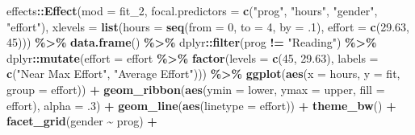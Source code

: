 \documentclass[
]{article}
\newenvironment{Shaded}{\begin{snugshade}}{\end{snugshade}}
\newcommand{\AttributeTok}[1]{\textcolor[rgb]{0.13,0.29,0.53}{#1}}
\newcommand{\DecValTok}[1]{\textcolor[rgb]{0.00,0.00,0.81}{#1}}
\newcommand{\FloatTok}[1]{\textcolor[rgb]{0.00,0.00,0.81}{#1}}
\newcommand{\FunctionTok}[1]{\textcolor[rgb]{0.13,0.29,0.53}{\textbf{#1}}}
\newcommand{\NormalTok}[1]{#1}
\newcommand{\SpecialCharTok}[1]{\textcolor[rgb]{0.81,0.36,0.00}{\textbf{#1}}}
\newcommand{\StringTok}[1]{\textcolor[rgb]{0.31,0.60,0.02}{#1}}
\begin{document}
\begin{Shaded}
\begin{Highlighting}[]
\NormalTok{effects}\SpecialCharTok{::}\FunctionTok{Effect}\NormalTok{(}\AttributeTok{mod =}\NormalTok{ fit\_2,}
                \AttributeTok{focal.predictors =} \FunctionTok{c}\NormalTok{(}\StringTok{"prog"}\NormalTok{, }\StringTok{"hours"}\NormalTok{, }
                                     \StringTok{"gender"}\NormalTok{, }\StringTok{"effort"}\NormalTok{),}
                \AttributeTok{xlevels =} \FunctionTok{list}\NormalTok{(}\AttributeTok{hours =} \FunctionTok{seq}\NormalTok{(}\AttributeTok{from =} \DecValTok{0}\NormalTok{,}
                                           \AttributeTok{to =} \DecValTok{4}\NormalTok{,}
                                           \AttributeTok{by =}\NormalTok{ .}\DecValTok{1}\NormalTok{),}
                               \AttributeTok{effort =} \FunctionTok{c}\NormalTok{(}\FloatTok{29.63}\NormalTok{, }\DecValTok{45}\NormalTok{))) }\SpecialCharTok{\%\textgreater{}\%} 
  \FunctionTok{data.frame}\NormalTok{() }\SpecialCharTok{\%\textgreater{}\%} 
\NormalTok{  dplyr}\SpecialCharTok{::}\FunctionTok{filter}\NormalTok{(prog }\SpecialCharTok{!=} \StringTok{"Reading"}\NormalTok{) }\SpecialCharTok{\%\textgreater{}\%} 
\NormalTok{  dplyr}\SpecialCharTok{::}\FunctionTok{mutate}\NormalTok{(}\AttributeTok{effort =}\NormalTok{ effort }\SpecialCharTok{\%\textgreater{}\%} 
                  \FunctionTok{factor}\NormalTok{(}\AttributeTok{levels =} \FunctionTok{c}\NormalTok{(}\DecValTok{45}\NormalTok{, }\FloatTok{29.63}\NormalTok{),}
                         \AttributeTok{labels =} \FunctionTok{c}\NormalTok{(}\StringTok{"Near Max Effort"}\NormalTok{,}
                                    \StringTok{"Average Effort"}\NormalTok{))) }\SpecialCharTok{\%\textgreater{}\%} 
  \FunctionTok{ggplot}\NormalTok{(}\FunctionTok{aes}\NormalTok{(}\AttributeTok{x =}\NormalTok{ hours,}
             \AttributeTok{y =}\NormalTok{ fit,}
             \AttributeTok{group =}\NormalTok{ effort)) }\SpecialCharTok{+}
  \FunctionTok{geom\_ribbon}\NormalTok{(}\FunctionTok{aes}\NormalTok{(}\AttributeTok{ymin =}\NormalTok{ lower,}
                  \AttributeTok{ymax =}\NormalTok{ upper,}
                  \AttributeTok{fill =}\NormalTok{ effort),}
              \AttributeTok{alpha =}\NormalTok{ .}\DecValTok{3}\NormalTok{) }\SpecialCharTok{+}
  \FunctionTok{geom\_line}\NormalTok{(}\FunctionTok{aes}\NormalTok{(}\AttributeTok{linetype =}\NormalTok{ effort)) }\SpecialCharTok{+}
  \FunctionTok{theme\_bw}\NormalTok{() }\SpecialCharTok{+}
  \FunctionTok{facet\_grid}\NormalTok{(gender }\SpecialCharTok{\textasciitilde{}}\NormalTok{ prog) }\SpecialCharTok{+}

\end{Highlighting}
\end{Shaded}
\end{document}
